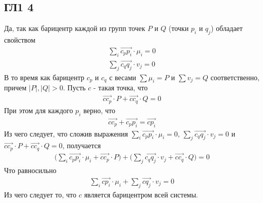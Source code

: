 	\subsection{ГЛ1 4}
		Да, так как барицентр каждой из групп точек $P$ и $Q$ (точки $p_i$ и $q_j$) обладает свойством		 
		\begin{gather*}
		\sum_{i} \overrightarrow{c_p p_i} \cdot \mu_i = 0\\
		\sum_{j} \overrightarrow{c_q q_j} \cdot v_j = 0
		\end{gather*}		 
		 В то время как барицентр $c_p$ и $c_q$ с весами $\sum \mu_i = P$ и $\sum v_j = Q$ соответственно, причем $|P|, |Q| > 0$. Пусть $c$ - такая точка, что
		 \begin{gather*}
		 \overrightarrow{c c_p} \cdot P + \overrightarrow{c c_q} \cdot Q = 0
		 \end{gather*}		 
		 При этом для каждого $p_i$ верно, что 
		 \begin{gather*}
		 \overrightarrow{c c_p} + \overrightarrow{c_p p_i} = \overrightarrow{c p_i}
		 \end{gather*}		 
		 Из чего следует, что сложив выражения $\sum_{i} \overrightarrow{c_p p_i} \cdot \mu_i = 0$, $\sum_{j} \overrightarrow{c_q q_j} \cdot v_j = 0$ и $\overrightarrow{c c_p} \cdot P + \overrightarrow{c c_q} \cdot Q = 0$, получается
		 \begin{gather*}
		 \biggl(\sum_{i} \overrightarrow{c_p p_i} \cdot \mu_i + \overrightarrow{c c_p} \cdot P \biggl) + \biggl( \sum_{j} \overrightarrow{c_q q_j} \cdot v_j + \overrightarrow{c c_q} \cdot Q \biggl) = 0
		 \end{gather*}		 
		 Что равносильно
		 \begin{gather*}
		 \sum_{i} \overrightarrow{c p_i} \cdot \mu_i + \sum_{j} \overrightarrow{c q_j} \cdot v_j = 0
		 \end{gather*}		 
		 Из чего следует то, что $c$ является барицентром всей системы.
				
\newpage
